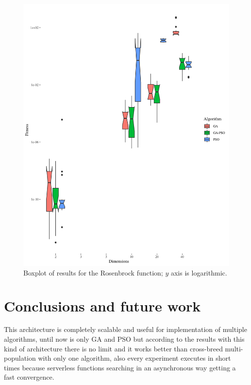 \documentclass[runningheads]{llncs}
\begin{document}
                 \begin{figure}[h!tb]
              \centering
                \includegraphics[height=0.5\textheight]{img/rosenbrock-boxplot.png}
              \caption{Boxplot of results for the Rosenbrock function; $y$ axis is logarithmic.\label{fig:boxplot:rosenbrock}}
            \end{figure}
            
\section{Conclusions and future work}

This architecture is completely scalable and useful for implementation of
multiple algorithms, until now is only GA and PSO but according to the results
with this kind of architecture there is no limit and it works better than
cross-breed multi-population with only one algorithm, also every experiment executes in
short times because serverless functions searching in an asynchronous way
getting a fast convergence.
\end{document}
